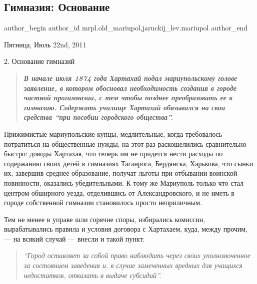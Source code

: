  
 
 
 
 
 
\subsection{Гимназия: Основание}
\label{sec:22_07_2011.stz.mrpl.old_mariupol.1.gimnazia_osnovanie}
 
\ifcmt
 author_begin
   author_id mrpl.old_mariupol,jaruckij_lev.mariupol
 author_end
\fi

Пятница, Июль 22nd, 2011

2. Основание гимназий

\begin{quote}
\em\bfseries В начале июля 1874 года Хартахай подал мариупольскому голове заявление, в
котором обосновал необходимость создания в городе частной прогимназии, с тем
чтобы позднее пре­образовать ее в гимназию. Содержать училище Хартахай
обязывался на свои средства \enquote{при пособии городского общества}.
\end{quote}


Прижимистые мариупольские купцы, медлительные, когда требовалось потратиться на
общественные нужды, на этот раз раскошелились сравнительно быстро: доводы
Хартахая, что теперь им не придется нести расходы по содержанию своих детей в
гимназиях Таганрога, Бердянска, Харькова, что сынки их, завершив среднее
образование, получат льготы при отбывании воинской повинности, оказались
убедительными. К тому же Мариуполь только что стал центром обширного уезда,
отделившись от Александровского, и не иметь в городе собственной гимназии
становилось просто неприличным.

Тем не менее в управе шли горячие споры, избирались комиссии, вырабатывались
пра­вила и условия договора с Хартахаем, куда, между прочим, — на всякий случай
— внесли и такой пункт: 

\begin{quote}
\em\enquote{Город оставляет за собой право наблюдать через своих
уполномоченное за состоянием заведения и, в случае замеченных вредных для
учащихся недостатков, отказать в выдаче субсидий}. 
\end{quote}

